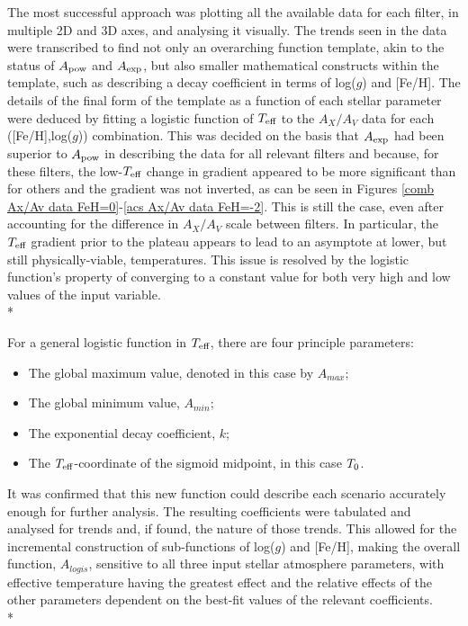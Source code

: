 \documentclass[12pt, a4paper]{report}
\begin{document}
The most successful approach was plotting all the available data for each filter, in multiple 2D and 3D axes, and analysing it visually. The trends seen in the data were transcribed to find not only an overarching function template, akin to the status of $A_{\textnormal{pow}}$ and $A_{\textnormal{exp}}$, but also smaller mathematical constructs within the template, such as describing a decay coefficient in terms of log($g$) and [Fe/H]. The details of the final form of the template as a function of each stellar parameter were deduced by fitting a logistic function of $T_{\textnormal{eff}}$ to the $A_{X}/A_{V}$ data for each ([Fe/H],log($g$)) combination. This was decided on the basis that $A_{\textnormal{exp}}$ had been superior to $A_{\textnormal{pow}}$ in describing the data for all relevant filters and because, for these filters, the low-$T_{\textnormal{eff}}$ change in gradient appeared to be more significant than for others and the gradient was not inverted, as can be seen in Figures \ref{comb Ax/Av data FeH=0}-\ref{acs Ax/Av data FeH=-2}. This is still the case, even after accounting for the difference in $A_{X}/A_{V}$ scale between filters. In particular, the $T_{\textnormal{eff}}$ gradient prior to the plateau appears to lead to an asymptote at lower, but still physically-viable, temperatures. This issue is resolved by the logistic function's property of converging to a constant value for both very high and low values of the input variable.  \\*

For a general logistic function in $T_{\textnormal{eff}}$, there are four principle parameters:
\begin{itemize}
\item The global maximum value, denoted in this case by $A_{max}$;
\item The global minimum value, $A_{min}$;
\item The exponential decay coefficient, $k$;
\item The $T_{\textnormal{eff}}$-coordinate of the sigmoid midpoint, in this case $T_{\textnormal{0}}$.
\end{itemize}

It was confirmed that this new function could describe each scenario accurately enough for further analysis. The resulting coefficients were tabulated and analysed for trends and, if found, the nature of those trends. This allowed for the incremental construction of sub-functions of log($g$) and [Fe/H], making the overall function, $A_{logis}$, sensitive to all three input stellar atmosphere parameters, with effective temperature having the greatest effect and the relative effects of the other parameters dependent on the best-fit values of the relevant coefficients.\\*
\end{document}
